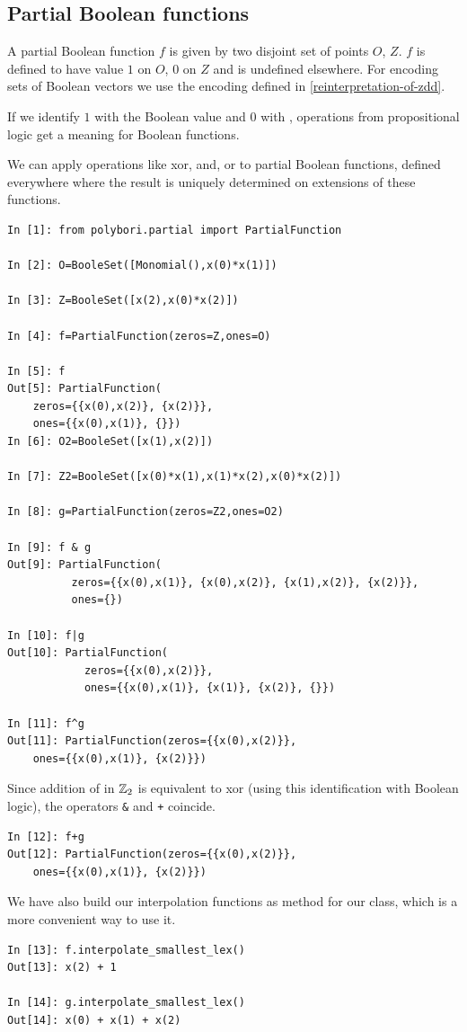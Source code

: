 \subsection{Partial Boolean functions}
A partial Boolean function $f$ is given by two disjoint set of points $O$, $Z$.
$f$ is defined to have value $1$ on $O$, $0$ on $Z$ and is undefined elsewhere.
For encoding sets of Boolean vectors we use the encoding defined in \ref{reinterpretation-of-zdd}.

If we identify $1$ with the Boolean value  and $0$ with ,
operations from propositional logic get a meaning for Boolean functions.

We can apply operations like xor, and, or to partial Boolean functions, defined everywhere where the result is uniquely determined on
extensions of these functions. 

\begin{lstlisting}
In [1]: from polybori.partial import PartialFunction

In [2]: O=BooleSet([Monomial(),x(0)*x(1)])

In [3]: Z=BooleSet([x(2),x(0)*x(2)])

In [4]: f=PartialFunction(zeros=Z,ones=O)

In [5]: f
Out[5]: PartialFunction(
    zeros={{x(0),x(2)}, {x(2)}},
    ones={{x(0),x(1)}, {}})
In [6]: O2=BooleSet([x(1),x(2)])

In [7]: Z2=BooleSet([x(0)*x(1),x(1)*x(2),x(0)*x(2)])

In [8]: g=PartialFunction(zeros=Z2,ones=O2)

In [9]: f & g
Out[9]: PartialFunction(
          zeros={{x(0),x(1)}, {x(0),x(2)}, {x(1),x(2)}, {x(2)}}, 
          ones={})

In [10]: f|g
Out[10]: PartialFunction(
            zeros={{x(0),x(2)}}, 
            ones={{x(0),x(1)}, {x(1)}, {x(2)}, {}})

In [11]: f^g
Out[11]: PartialFunction(zeros={{x(0),x(2)}},
    ones={{x(0),x(1)}, {x(2)}})
\end{lstlisting}

Since addition of in $\mathbb{Z}_2$ is equivalent to xor (using this identification with Boolean logic), the operators \lstinline|&| and \lstinline|+| coincide.
\begin{lstlisting}
In [12]: f+g
Out[12]: PartialFunction(zeros={{x(0),x(2)}}, 
    ones={{x(0),x(1)}, {x(2)}})
\end{lstlisting}

We have also build our interpolation functions as method for our  class, which is a more convenient way to use it.
\begin{lstlisting}
In [13]: f.interpolate_smallest_lex()
Out[13]: x(2) + 1

In [14]: g.interpolate_smallest_lex()
Out[14]: x(0) + x(1) + x(2)
\end{lstlisting}
